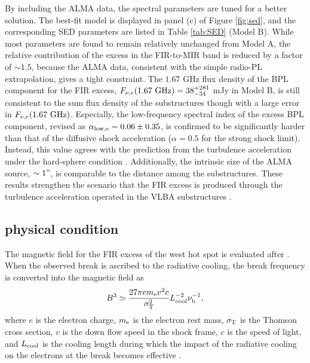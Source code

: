 \documentclass[twocolumn]{aastex631}
\begin{document}
By including the ALMA data, 
the spectral parameters are tuned for a better solution.  
The best-fit model is displayed in panel (c) of Figure \ref{fig:sed},
and the corresponding SED parameters 
are listed in Table \ref{tab:SED} (Model B).
While most parameters are found to remain relatively unchanged from Model A,
the relative contribution of the excess in the FIR-to-MIR band
is reduced by a factor of $\sim 1.5$,
because the ALMA data, 
consistent with the simple radio-PL extrapolation, 
gives a tight constraint. 
The $1.67$ GHz flux density of the BPL component for the FIR excess,
$F_{\nu,e}(1.67~\rm{GHz}) = 38_{-34}^{+281}$ mJy in Model B, 
is still consistent to the sum flux density of the substructures 
\citep[$121.3$ mJy;][]{tingay2008}
though with a large error in $F_{\nu,e}(1.67~\rm{GHz})$. 
Especially, the low-frequency spectral index of the excess BPL component, revised as $\alpha_{\rm low,e} = 0.06 \pm 0.35$,
is confirmed to be significantly harder than 
that of the diffusive shock acceleration 
($\alpha = 0.5$ for the strong shock limit). 
Instead, this value agrees with the prediction
from the turbulence acceleration 
\citep[$\alpha = 0$;][]{asano2014}
under the hard-sphere condition \citep{park1995}.
Additionally,  
the intrinsic size of the ALMA source, $\sim 1"$,
is comparable to the distance among the substructures. 
These results strengthen the scenario  
that the FIR excess is produced through the turbulence acceleration 
operated in the VLBA substructures \citep{isobe2020}.


\subsection{physical condition}
\label{sec:physical_condition}
The magnetic field for the FIR excess of the west hot spot 
is evaluated after \citet{isobe2020}.
When the observed break is ascribed to the radiative cooling,
the break frequency is converted into the magnetic field 
as
\begin{equation}
B^3 \simeq
\frac{27 \pi e m_{\rm e} v^2  c}{\sigma_{\rm T}^2} L_{\rm cool}^{-2} \nu_{\rm b}^{-1},
\label{eq:Bme}
\end{equation} 
where $e$ is the electron charge, $m_{\rm e}$ is the electron rest mass,
$\sigma_{\rm T}$ is the Thomson cross section, 
$v$ is the down flow speed in the shock frame, $c$ is the speed of light, and $L_{\rm cool}$ is the cooling length during which 
the impact of the radiative cooling on the electrons 
at the break becomes effective \citep{inoue1996}.
\end{document}
